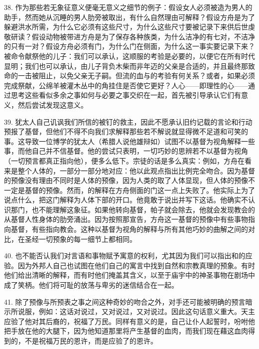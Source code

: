 38. 作为那些若无象征意义便毫无意义之细节的例子：假设女人必须被造为男人的助手，然而她从沉睡的男人肋旁被取出，有什么自然理由可解释？假设方舟是为了躲避洪水所需，为什么它必须有这些尺寸，为什么这些尺寸要被记录下来供后世虔敬研读？假设动物被带进方舟是为了保存各种族类，为什么洁净的有七对，不洁净的只有一对？假设方舟必须有门，为什么门在侧面，为什么这一事实要记录下来？被命令献祭他的儿子：我们可以承认，这顺服的考验是必要的，以便它在所有时代显明；我们也可以承认，由儿子背负木柴而非年迈的父亲是合适的，并且最终那致命的一击被阻止，以免父亲无子嗣。但流的血与的考验有何关系？或者，如果必须完成祭献，公绵羊被灌木丛中的角挂住是否使它更好？人心——即理性的心——通过思考这些看似多余之事如何与必要之事交织在一起，首先被引导承认它们有意义，然后尝试发现这意义。\par

39. 犹太人自己讥讽我们所信的被钉的救主，因此不愿承认旧约记载的言论和行动预报了基督，但他们不得不向我们求解释那些若不解说就显得微不足道和可笑的事。这导致一位博学的犹太人（希腊人说他雄辩如）试图不以基督为视角解释一些事，而他自己并不信基督。他的尝试只表明，一切巧妙的思辨若不以基督为视角（一切预言都真正指向他），便多么低下。宗徒的话是多么真实：例如，方舟在看来是整个人体的，一部分一部分地对应：他以此观点指出比例完全吻合。因为基督的预像没有理由不同时是人体的预像，因为人类的取了人体显现，但人体的预像不一定是基督的预像。然而，的解释在方舟侧面的门这一点上失败了。他实际上为了说点什么，把这门解释为人体下部的开口。他竟敢于说出并写下这话。他确实不认识那门，也不能理解这象征。如果他转向基督，帕子就会除去，他就会发现教会的从基督人性身体的肋旁涌出。因为按照那宣告，方舟这一基督的预像中有些事物指向基督，有些指向教会。这种以基督为视角的解释与所有其他巧妙的曲解之间的对比，在圣经一切预象的每一细节上都相同。\par

40. 也不能否认我们对言语和事物赋予寓意的权利，尤其因为我们可以指出和的应验。因为外邦人自己也试图在他们自己的寓言中找到自然和宗教真理的预象。有时他们给出清晰的解释，而有时他们掩盖其含义，以至于庙宇中的神圣事物在剧场中成了笑柄。他们将可耻的放荡与卑劣的迷信结合在一起。\par

41. 除了预像与所预表之事之间这种奇妙的吻合之外，对手还可能被明确的预言暗示所说服，例如：这话对说过，又对说过，又对说过。因此这句话意义重大。天主应验了他对其后裔的，祝福了万民。同样有意义的是，自己让仆人起誓时，吩咐他把手放在他的大腿下，因为他知道那里将产生基督的血肉，而我们现在藉这血肉得到的，不是祝福万民的恩许，而是应验了的恩许。\par

